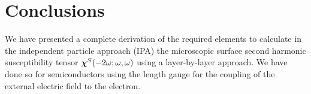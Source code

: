 \documentclass[floatfix,prb,aps,superscriptaddress,11pt,preprint,letterpaper]{revtex4}
\begin{document}
\section{Conclusions}\label{con}

We have presented a complete derivation of the required elements to
calculate in the independent particle approach (IPA) the microscopic  
surface second harmonic susceptibility tensor $\boldsymbol{\chi}^S(-2\omega;\omega,\omega)$ 
using a layer-by-layer approach. We have done so for semiconductors using 
the length gauge for the coupling of the external electric field to the 
electron. 

\appendix
%
%
%
%
%
%

%

\end{document}
